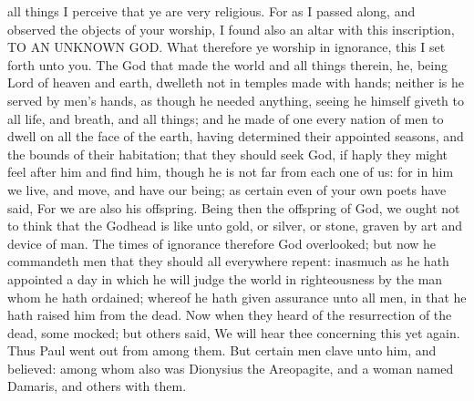 all things I perceive that ye are very religious. For as I passed along, and observed the objects of your worship, I found also an altar with this inscription, TO AN UNKNOWN GOD. What therefore ye worship in ignorance, this I set forth unto you. The God that made the world and all things therein, he, being Lord of heaven and earth, dwelleth not in temples made with hands; neither is he served by men’s hands, as though he needed anything, seeing he himself giveth to all life, and breath, and all things; and he made of one every nation of men to dwell on all the face of the earth, having determined their appointed seasons, and the bounds of their habitation; that they should seek God, if haply they might feel after him and find him, though he is not far from each one of us: for in him we live, and move, and have our being; as certain even of your own poets have said, For we are also his offspring.  Being then the offspring of God, we ought not to think that the Godhead is like unto gold, or silver, or stone, graven by art and device of man. The times of ignorance therefore God overlooked; but now he commandeth men that they should all everywhere repent: inasmuch as he hath appointed a day in which he will judge the world in righteousness by the man whom he hath ordained; whereof he hath given assurance unto all men, in that he hath raised him from the dead.  Now when they heard of the resurrection of the dead, some mocked; but others said, We will hear thee concerning this yet again. Thus Paul went out from among them. But certain men clave unto him, and believed: among whom also was Dionysius the Areopagite, and a woman named Damaris, and others with them. 

